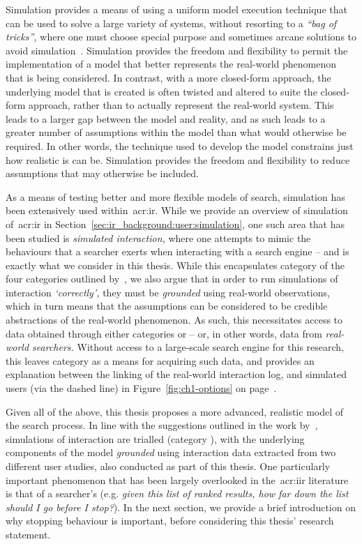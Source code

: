 Simulation provides a means of using a uniform model execution technique that can be used to solve a large variety of systems, without resorting to a \emph{``bag of tricks'',} where one must choose special purpose and sometimes arcane solutions to avoid simulation~\citep{fishwick1995simulation}. Simulation provides the freedom and flexibility to permit the implementation of a model that better represents the real-world phenomenon that is being considered. In contrast, with a more closed-form approach, the underlying model that is created is often twisted and altered to suite the closed-form approach, rather than to actually represent the real-world system. This leads to a larger gap between the model and reality, and as such leads to a greater number of assumptions within the model than what would otherwise be required. In other words, the technique used to develop the model constrains just how realistic is can be. Simulation provides the freedom and flexibility to reduce assumptions that may otherwise be included.

As a means of testing better and more flexible models of search, simulation has been extensively used within~\gls{acr:ir}. While we provide an overview of simulation of~\gls{acr:ir} in Section~\ref{sec:ir_background:user:simulation}, one such area that has been studied is \emph{simulated interaction,} where one attempts to mimic the behaviours that a searcher exerts when interacting with a search engine -- and is exactly what we consider in this thesis. While this encapsulates category  of the four categories outlined by~\cite{keskustalo2008user_simulation}, we also argue that in order to run simulations of interaction \emph{`correctly',} they must be \emph{grounded} using real-world observations, which in turn means that the assumptions can be considered to be credible abstractions of the real-world phenomenon. As such, this necessitates access to data obtained through either categories  or  -- or, in other words, data from \emph{real-world searchers.} Without access to a large-scale search engine for this research, this leaves category  as a means for acquiring such data, and provides an explanation between the linking of the real-world interaction log, and simulated users (via the dashed line) in Figure~\ref{fig:ch1-options} on page~\pageref{fig:ch1-options}.

\noindent
{}
Given all of the above, this thesis proposes a more advanced, realistic model of the search process. In line with the suggestions outlined in the work by~\cite{keskustalo2008user_simulation}, simulations of interaction are trialled (category ), with the underlying components of the model \emph{grounded} using interaction data extracted from two different user studies, also conducted as part of this thesis. One particularly important phenomenon that has been largely overlooked in the~\gls{acr:iir} literature is that of a searcher's  (e.g. \emph{given this list of ranked results, how far down the list should I go before I stop?}). In the next section, we provide a brief introduction on why stopping behaviour is important, before considering this thesis' research statement.

